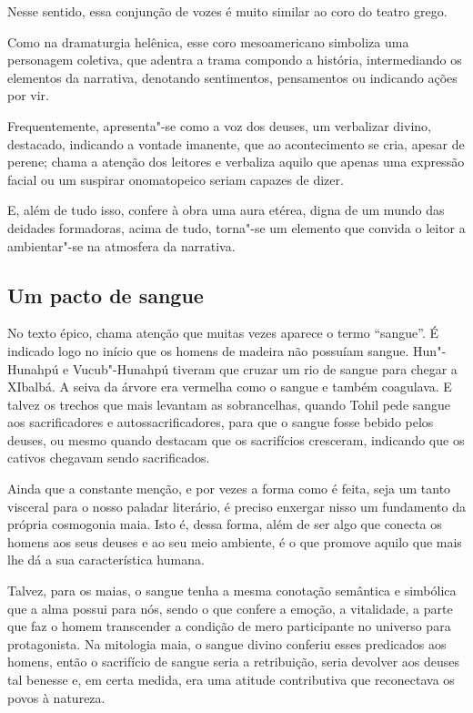 \documentclass[12pt]{extarticle}
\begin{document}
Nesse sentido, essa conjunção de vozes é muito similar ao coro do teatro
grego.

Como na dramaturgia helênica, esse coro mesoamericano simboliza uma
personagem coletiva, que adentra a trama compondo a história,
intermediando os elementos da narrativa, denotando sentimentos,
pensamentos ou indicando ações por vir.

Frequentemente, apresenta"-se como a voz dos deuses, um verbalizar
divino, destacado, indicando a vontade imanente, que ao acontecimento se
cria, apesar de perene; chama a atenção dos leitores e verbaliza aquilo
que apenas uma expressão facial ou um suspirar onomatopeico seriam
capazes de dizer.

E, além de tudo isso, confere à obra uma aura etérea, digna de um mundo
das deidades formadoras, acima de tudo, torna"-se um elemento que convida
o leitor a ambientar"-se na atmosfera da narrativa.

\subsection{Um pacto de sangue}

No texto épico, chama atenção que muitas vezes aparece o termo
``sangue''. É indicado logo no início que os homens de madeira não
possuíam sangue. Hun"-Hunahpú e Vucub"-Hunahpú tiveram que cruzar um rio
de sangue para chegar a XIbalbá. A seiva da árvore era vermelha como o
sangue e também coagulava. E talvez os trechos que mais levantam as
sobrancelhas, quando Tohil pede sangue aos sacrificadores e
autossacrificadores, para que o sangue fosse bebido pelos deuses, ou
mesmo quando destacam que os sacrifícios cresceram, indicando que os
cativos chegavam sendo sacrificados.

Ainda que a constante menção, e por vezes a forma como é feita, seja um
tanto visceral para o nosso paladar literário, é preciso enxergar nisso
um fundamento da própria cosmogonia maia. Isto é, dessa forma, além de
ser algo que conecta os homens aos seus deuses e ao seu meio ambiente, é
o que promove aquilo que mais lhe dá a sua característica humana.

Talvez, para os maias, o sangue tenha a mesma conotação semântica e
simbólica que a alma possui para nós, sendo o que confere a emoção, a
vitalidade, a parte que faz o homem transcender a condição de mero
participante no universo para protagonista. Na mitologia maia, o sangue
divino conferiu esses predicados aos homens, então o sacrifício de
sangue seria a retribuição, seria devolver aos deuses tal benesse e, em
certa medida, era uma atitude contributiva que reconectava os povos à
natureza.
\end{document}
